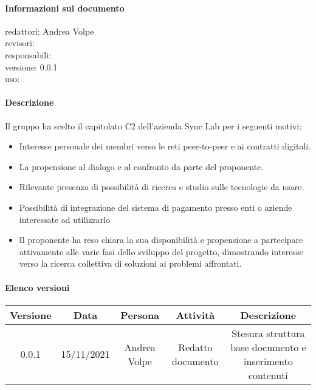\documentclass[a4paper,12pt]{article}
\begin{document}
\paragraph{Informazioni sul documento \\}
redattori: Andrea Volpe \\
revisori: \\
responsabili: \\
versione: 0.0.1 \\
uso:

\paragraph{Descrizione \\}
Il gruppo ha scelto il capitolato C2 dell’azienda Sync Lab per i seguenti motivi:
\begin{itemize}
\item Interesse personale dei membri verso le reti peer-to-peer e ai contratti digitali. 
\item La propensione al dialogo e al confronto da parte del proponente.
\item Rilevante presenza di possibilità di ricerca e studio sulle tecnologie da usare.
\item Possibilità di integrazione del sistema di pagamento presso enti o aziende interessate ad utilizzarlo
\item Il proponente ha reso chiara la sua disponibilità e propensione a partecipare attivamente alle varie fasi dello sviluppo del progetto, dimostrando interesse verso la ricerca collettiva di soluzioni ai problemi affrontati.
\end{itemize}

\paragraph{Elenco versioni \\}
\begin{tabular}{|c|c|c|c|c|}
    \hline
    \textbf{Versione} & \textbf{Data} & \textbf{Persona} & \textbf{Attività} & \textbf{Descrizione}\\
    \hline
    0.0.1 & 15/11/2021 & Andrea Volpe & Redatto documento & Stesura struttura base documento e inserimento contenuti\\
    \hline
    \end{tabular}
\end{document}
